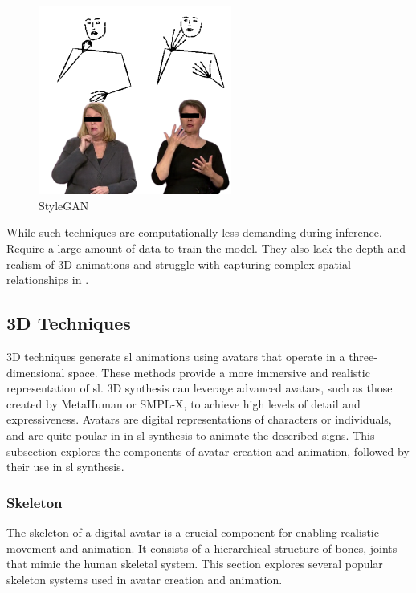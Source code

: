 \documentclass[../../main.tex]{subfiles}
\begin{document}
\begin{figure} 
  \centering \includegraphics[width = 2.5in]{chapters/background_work/images/gan_synthesis.png} 
  \caption{StyleGAN~\cite{saunders2020everybodysignnowtranslating}} 
  \label{fig:synthesis_gan_2d} 
\end{figure}

While such techniques are computationally less demanding during inference. Require a large amount of data to train the model. They also lack the depth and realism of 3D animations and struggle with capturing complex spatial relationships in .

\subsection{3D Techniques}
\label{ch:background_work:sign_language_synthesis:3d_techniques}

3D techniques generate \gls{sl} animations using avatars that operate in a three-dimensional space. These methods provide a more immersive and realistic representation of \gls{sl}. 3D synthesis can leverage advanced avatars, such as those created by MetaHuman or SMPL-X, to achieve high levels of detail and expressiveness. Avatars are digital representations of characters or individuals, and are quite poular in in \gls{sl} synthesis to animate the described signs. This subsection explores the components of avatar creation and animation, followed by their use in \gls{sl} synthesis.

\subsubsection{Skeleton}
\label{ch:background_work:sign_language_synthesis:3d_techniques:skeleton}

The skeleton of a digital avatar is a crucial component for enabling realistic movement and animation. It consists of a hierarchical structure of bones, joints that mimic the human skeletal system. This section explores several popular skeleton systems used in avatar creation and animation.
\end{document}
